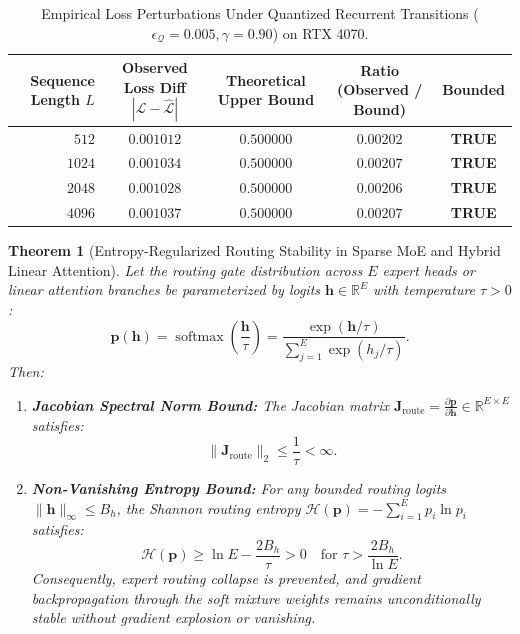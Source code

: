 \documentclass[journal]{IEEEtran}
\newtheorem{theorem}{Theorem}
\begin{document}
\begin{table}[h]
\centering
\caption{Empirical Loss Perturbations Under Quantized Recurrent Transitions ($\epsilon_{\mathcal{Q}}=0.005, \gamma=0.90$) on RTX 4070.}
\label{tab:quantized_loss_robustness}
\begin{tabular}{rcccc}
\toprule
\textbf{Sequence Length} $L$ & \textbf{Observed Loss Diff} $|\mathcal{L} - \hat{\mathcal{L}}|$ & \textbf{Theoretical Upper Bound} & \textbf{Ratio} (Observed / Bound) & \textbf{Bounded} \\
\midrule
$512$ & $0.001012$ & $0.500000$ & $0.00202$ & \textbf{TRUE} \\
$1024$ & $0.001034$ & $0.500000$ & $0.00207$ & \textbf{TRUE} \\
$2048$ & $0.001028$ & $0.500000$ & $0.00206$ & \textbf{TRUE} \\
$4096$ & $0.001037$ & $0.500000$ & $0.00207$ & \textbf{TRUE} \\
\bottomrule
\end{tabular}
\end{table}



\begin{theorem}[Entropy-Regularized Routing Stability in Sparse MoE and Hybrid Linear Attention]
\label{thm:entropy_routing_stability}
Let the routing gate distribution across $E$ expert heads or linear attention branches be parameterized by logits $\mathbf{h} \in \mathbb{R}^E$ with temperature $\tau > 0$:
\begin{equation}
\mathbf{p}(\mathbf{h}) = \operatorname{softmax}\left(\frac{\mathbf{h}}{\tau}\right) = \frac{\exp(\mathbf{h} / \tau)}{\sum_{j=1}^E \exp(h_j / \tau)}.
\end{equation}
Then:
\begin{enumerate}
    \item \textbf{Jacobian Spectral Norm Bound:} The Jacobian matrix $\mathbf{J}_{\text{route}} = \frac{\partial \mathbf{p}}{\partial \mathbf{h}} \in \mathbb{R}^{E \times E}$ satisfies:
    \begin{equation}
    \|\mathbf{J}_{\text{route}}\|_2 \le \frac{1}{\tau} < \infty.
    \end{equation}
    \item \textbf{Non-Vanishing Entropy Bound:} For any bounded routing logits $\|\mathbf{h}\|_\infty \le B_h$, the Shannon routing entropy $\mathcal{H}(\mathbf{p}) = -\sum_{i=1}^E p_i \ln p_i$ satisfies:
    \begin{equation}
    \mathcal{H}(\mathbf{p}) \ge \ln E - \frac{2 B_h}{\tau} > 0 \quad \text{for } \tau > \frac{2 B_h}{\ln E}.
    \end{equation}
    Consequently, expert routing collapse is prevented, and gradient backpropagation through the soft mixture weights remains unconditionally stable without gradient explosion or vanishing.
\end{enumerate}
\end{theorem}
\end{document}
